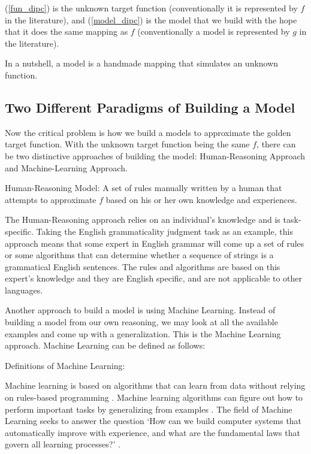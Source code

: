 \documentclass[final]{ua-thesis}
\numberwithin{equation}{section}
\begin{document}
(\ref{fun_dipc}) is the unknown target function (conventionally it is represented by $f$ in the literature), and (\ref{model_dipc}) is the model that we build with the hope that it does the same mapping as $f$ (conventionally a model is represented by $g$ in the literature).

In a nutshell, a model is a handmade mapping that simulates an unknown function. 

\subsection{Two Different Paradigms of Building a Model}

Now the critical problem is how we build a models to approximate the golden target function. With the unknown target function being the same $f$, there can be two distinctive approaches of building the model: Human-Reasoning Approach and Machine-Learning Approach. 

\begin{exe}
\ex Human-Reasoning Model:
A set of rules manually written by a human that attempts to approximate $f$ based on his or her own knowledge and experiences. 
\end{exe}

The Human-Reasoning approach relies on an individual's knowledge and is task-specific. 
Taking the English grammaticality judgment task as an example, this approach means that some expert in English grammar will come up a set of rules or some algorithms that can determine whether a sequence of strings is a grammatical English sentences. 
The rules and algorithms are based on this expert's knowledge and they are English specific, and are not applicable to other languages.     

Another approach to build a model is using Machine Learning. Instead of building a model from our own reasoning, we may look at all the available examples and come up with a generalization. This is the Machine Learning approach. 
Machine Learning can be defined as follows:

\begin{exe}
\ex Definitions of Machine Learning:
\begin{xlist}
	\ex Machine learning is based on algorithms that can learn from data without relying on rules-based programming \citep{pyle2015executive}. 
	\ex Machine learning algorithms can figure out how to perform important tasks by generalizing from examples \citep{domingos2012few}.
	\ex The field of Machine Learning seeks to answer the question `How can we build computer systems that automatically improve with experience, and what are the fundamental laws that govern all learning processes?' \citep{mitchell2006discipline}.
\end{xlist}
\end{exe}   
\end{document}
